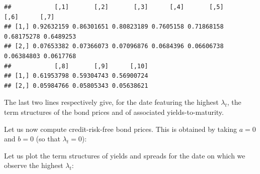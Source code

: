 \documentclass[
  12pt,
]{book}
\newenvironment{Shaded}{\begin{snugshade}}{\end{snugshade}}
\newcommand{\AttributeTok}[1]{\textcolor[rgb]{0.13,0.29,0.53}{#1}}
\newcommand{\DecValTok}[1]{\textcolor[rgb]{0.00,0.00,0.81}{#1}}
\newcommand{\FloatTok}[1]{\textcolor[rgb]{0.00,0.00,0.81}{#1}}
\newcommand{\FunctionTok}[1]{\textcolor[rgb]{0.13,0.29,0.53}{\textbf{#1}}}
\newcommand{\NormalTok}[1]{#1}
\newcommand{\OtherTok}[1]{\textcolor[rgb]{0.56,0.35,0.01}{#1}}
\newcommand{\SpecialCharTok}[1]{\textcolor[rgb]{0.81,0.36,0.00}{\textbf{#1}}}
\theoremstyle{definition}
\theoremstyle{definition}
\theoremstyle{definition}
\theoremstyle{definition}
\theoremstyle{remark}
\begin{document}
\begin{verbatim}
##            [,1]       [,2]       [,3]      [,4]       [,5]       [,6]      [,7]
## [1,] 0.92632159 0.86301651 0.80823189 0.7605158 0.71868158 0.68175278 0.6489253
## [2,] 0.07653382 0.07366073 0.07096876 0.0684396 0.06606738 0.06384803 0.0617768
##            [,8]       [,9]      [,10]
## [1,] 0.61953798 0.59304743 0.56900724
## [2,] 0.05984766 0.05805343 0.05638621
\end{verbatim}

The last two lines respectively give, for the date featuring the highest \(\lambda_t\), the term structures of the bond prices and of associated yields-to-maturity.

Let us now compute credit-risk-free bond prices. This is obtained by taking \(a=0\) and \(b=0\) (so that \(\lambda_t=0\)):

\begin{Shaded}
\end{Shaded}

Let us plot the term structures of yields and spreads for the date on which we observe the highest \(\lambda_t\):
\end{document}

